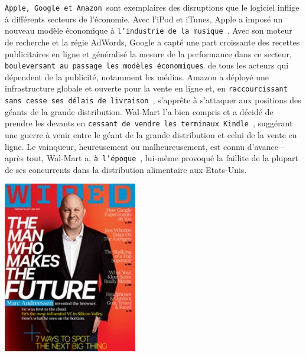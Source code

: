 \documentclass[11pt,twoside,a4paper]{article}
\begin{document}
\begin{minipage}[h]{12cm}
	\texttt{Apple, Google et Amazon}~\footnotemark sont exemplaires des disruptions que le logiciel inflige {\`a} diff{\'e}rents secteurs de l'{\'e}conomie. Avec l'iPod et iTunes, Apple a impos{\'e} un nouveau mod{\`e}le {\'e}conomique {\`a} \texttt{l'industrie de la musique}~\footnotemark. Avec son moteur de recherche et la r{\'e}gie AdWords, Google a capt{\'e} une part croissante des recettes publicitaires en ligne et g{\'e}n{\'e}ralis{\'e} la mesure de la performance dans ce secteur, \texttt{bouleversant au passage les mod{\`e}les {\'e}conomiques}~\footnotemark de tous les acteurs qui d{\'e}pendent de la publicit{\'e}, notamment les m{\'e}dias. Amazon a d{\'e}ploy{\'e} une infrastructure globale et ouverte pour la vente en ligne et, en \texttt{raccourcissant sans cesse ses d{\'e}lais de livraison}~\footnotemark, s'appr{\^e}te {\`a} s'attaquer aux positions des g{\'e}ants de la grande distribution. Wal-Mart l'a bien compris et a d{\'e}cid{\'e} de prendre les devants en \texttt{cessant de vendre les terminaux Kindle}~\footnotemark, sugg{\'e}rant une guerre {\`a} venir entre le g{\'e}ant de la grande distribution et celui de la vente en ligne. Le vainqueur, heureusement ou malheureusement, est connu d'avance -- apr{\`e}s tout, Wal-Mart a, \texttt{{\`a} l'{\'e}poque}~\footnotemark, lui-m{\^e}me provoqu{\'e} la faillite de la plupart de ses concurrents dans la distribution alimentaire aux Etats-Unis.
\end{minipage} \hfill \begin{minipage}[h]{6.00cm}
	\includegraphics[width=5.85cm]{img/2005-new.jpg}
\end{minipage} ~\\~\\
\end{document}

